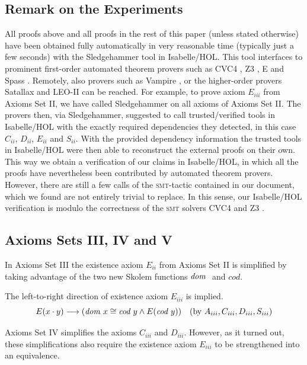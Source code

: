 \subsection{Remark on the Experiments}
All proofs above and all proofs in the rest of this paper (unless
stated otherwise) have been obtained fully automatically in very
reasonable time (typically just a few seconds) with the
Sledgehammer tool in Isabelle/HOL. This tool interfaces to prominent
first-order automated theorem provers such as CVC4 \cite{CVC4}, Z3
\cite{Z3}, E \cite{E} and Spass \cite{Spass}.  Remotely, also
  provers such as Vampire \cite{Vampire}, or the higher-order provers
  Satallax \cite{Satallax} and LEO-II \cite{LEO} can be reached. For
  example, to prove axiom $E_{iii}$ from Axioms Set II, we have called
  Sledgehammer on all axioms of Axioms Set II. The provers then, via
  Sledgehammer, suggested to call trusted/verified tools in
  Isabelle/HOL with the exactly required dependencies they
  detected, in this case $C_{ii}$, $D_{ii}$, $E_{ii}$ and $S_{ii}$. With the provided dependency information the trusted tools
  in Isabelle/HOL were then able to reconstruct the external proofs on
  their own.  This way we obtain a verification of our claims in
  Isabelle/HOL, in which all the proofs have nevertheless been
  contributed by automated theorem provers. However, there are still
  a few calls of the \textsc{smt}-tactic contained in our document, 
   which we found are not entirely trivial to replace. In this sense, our
   Isabelle/HOL verification is modulo the correctness of the \textsc{smt} solvers
   CVC4 \cite{CVC4} and Z3 \cite{Z3}.



\subsection{Axioms Sets III, IV and V} 
In Axioms Set III the existence  axiom  $E_{ii}$ from Axioms Set II  is simplified by taking advantage of 
  the two new Skolem functions ${\textit{dom \/}}$ and $cod$.

The left-to-right direction of existence axiom $E_{iii}$ is implied.
  $$E(x \cdot y) \longrightarrow (\textit{dom \/} x \cong \textit{cod \/} y \wedge E(\textit{cod \/} y)) \quad  
    (\text{by } A_{iii}, C_{iii}, D_{iii}, S_{iii})$$


Axioms Set IV simplifies the axioms $C_{iii}$ and  $D_{iii}$. However, as it turned 
 out, these simplifications also require the existence axiom $E_{iii}$ to be strengthened into
 an equivalence.

